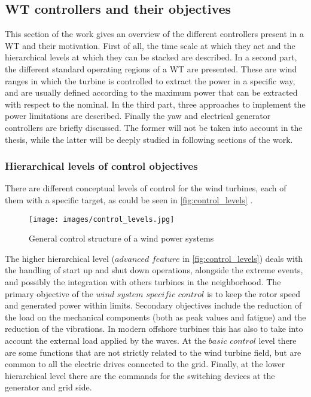 \subsection{WT controllers and their objectives} \label{subsec:control_objective}
This section of the work gives an overview of the different controllers present in a WT and their motivation. First of all, the time scale at which they act and the hierarchical levels at which they can be stacked are described. In a second part, the different standard operating regions of a WT are presented. These are wind ranges in which the turbine is controlled to extract the power in a specific way, and are usually defined according to the maximum power that can be extracted with respect to the nominal. In the third part, three approaches to implement the power limitations are described. Finally the yaw and electrical generator controllers are briefly discussed. The former will not be taken into account in the thesis, while the latter will be deeply studied in following sections of the work.  

\subsubsection{Hierarchical levels of control objectives}
There are different conceptual levels of control for the wind turbines, each of them with a specific target, as could be seen in \autoref{fig:control_levels} \cite{9535421}.
\begin{figure}[htb]
  \centering
  \texttt{[image: images/control\_levels.jpg]}
  \caption{General control structure of a wind power systems \cite{9535421}}
  \label{fig:control_levels}
\end{figure}

The higher hierarchical level ($\textit{advanced feature}$ in \autoref{fig:control_levels}) deals with the handling of start up and shut down operations, alongside the extreme events, and possibly the integration with others turbines in the neighborhood. The primary objective of the $\textit{wind system specific control}$ is to keep the rotor speed and generated power within limits. Secondary objectives include the reduction of the load on the mechanical components (both as peak values and fatigue) and the reduction of the vibrations. In modern offshore turbines this has also to take into account the external load applied by the waves. At the $\textit{basic control}$ level there are some functions that are not strictly related to the wind turbine field, but are common to all the electric drives connected to the grid. Finally, at the lower hierarchical level there are the commands for the switching devices at the generator and grid side. 

